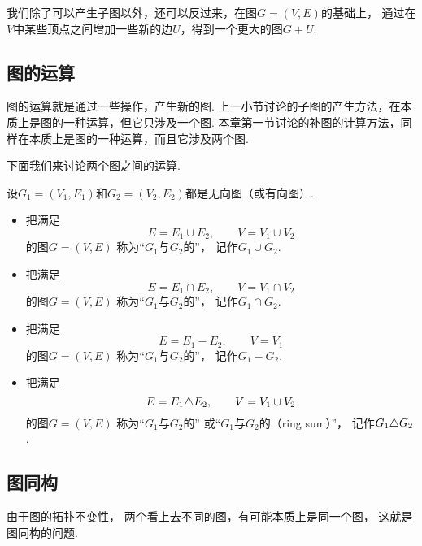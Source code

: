 我们除了可以产生子图以外，还可以反过来，在图\(G = (V,E)\)的基础上，
通过在\(V\)中某些顶点之间增加一些新的边\(U\)，得到一个更大的图\(G + U\).

\subsection{图的运算}
图的运算就是通过一些操作，产生新的图.
上一小节讨论的子图的产生方法，在本质上是图的一种运算，但它只涉及一个图.
本章第一节讨论的补图的计算方法，同样在本质上是图的一种运算，而且它涉及两个图.

下面我们来讨论两个图之间的运算.
\begin{definition}
设\(G_1 = (V_1,E_1)\)和\(G_2 = (V_2,E_2)\)都是无向图（或有向图）.
\begin{itemize}
	\item 把满足\begin{equation*}
		E = E_1 \cup E_2,
		\qquad
		V = V_1 \cup V_2
	\end{equation*}的图\(G = (V,E)\)
	称为“\(G_1\)与\(G_2\)的”，
	记作\(G_1 \cup G_2\).

	\item 把满足\begin{equation*}
		E = E_1 \cap E_2,
		\qquad
		V = V_1 \cap V_2
	\end{equation*}的图\(G = (V,E)\)
	称为“\(G_1\)与\(G_2\)的”，
	记作\(G_1 \cap G_2\).

	\item 把满足\begin{equation*}
		E = E_1 - E_2,
		\qquad
		V = V_1
	\end{equation*}的图\(G = (V,E)\)
	称为“\(G_1\)与\(G_2\)的”，
	记作\(G_1 - G_2\).

	\item 把满足\begin{equation*}
		E = E_1 \triangle E_2,
		\qquad
		V = V_1 \cup V_2
	\end{equation*}的图\(G = (V,E)\)
	称为“\(G_1\)与\(G_2\)的”
	或“\(G_1\)与\(G_2\)的（ring sum）”，
	记作\(G_1 \triangle G_2\).
\end{itemize}
\end{definition}

\subsection{图同构}
由于图的拓扑不变性，
两个看上去不同的图，有可能本质上是同一个图，
这就是图同构的问题.

